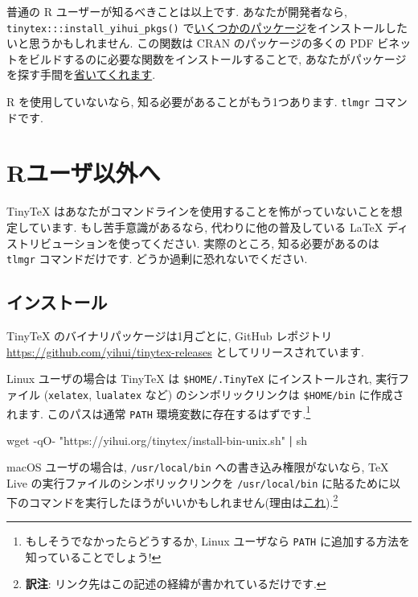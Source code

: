 \documentclass[
  xelatex,ja=standard,jafont=noto]{bxjsreport}
\newenvironment{Shaded}{\begin{snugshade}}{\end{snugshade}}
\newcommand{\AttributeTok}[1]{\textcolor[rgb]{0.77,0.63,0.00}{#1}}
\newcommand{\FunctionTok}[1]{\textcolor[rgb]{0.00,0.00,0.00}{#1}}
\newcommand{\KeywordTok}[1]{\textcolor[rgb]{0.13,0.29,0.53}{\textbf{#1}}}
\newcommand{\StringTok}[1]{\textcolor[rgb]{0.31,0.60,0.02}{#1}}
\begin{document}
普通の R ユーザーが知るべきことは以上です. あなたが開発者なら,
\texttt{tinytex:::install\_yihui\_pkgs()}
で\href{https://github.com/yihui/tinytex/blob/master/tools/pkgs-yihui.txt}{いくつかのパッケージ}をインストールしたいと思うかもしれません.
この関数は CRAN のパッケージの多くの PDF
ビネットをビルドするのに必要な関数をインストールすることで,
あなたがパッケージを探す手間を\href{https://github.com/yihui/tinytex/issues/135}{省いてくれます}.

R を使用していないなら, 知る必要があることがもう1つあります.
\texttt{tlmgr} コマンドです.

\hypertarget{rux30e6ux30fcux30b6ux4ee5ux5916ux3078}{%
\section{Rユーザ以外へ}\label{rux30e6ux30fcux30b6ux4ee5ux5916ux3078}}

TinyTeX
はあなたがコマンドラインを使用することを怖がっていないことを想定しています.
もし苦手意識があるなら, 代わりに他の普及している LaTeX
ディストリビューションを使ってください. 実際のところ, 知る必要があるのは
\texttt{tlmgr} コマンドだけです. どうか過剰に恐れないでください.

\hypertarget{ux30a4ux30f3ux30b9ux30c8ux30fcux30eb}{%
\subsection{インストール}\label{ux30a4ux30f3ux30b9ux30c8ux30fcux30eb}}

TinyTeX のバイナリパッケージは1月ごとに, GitHub レポジトリ
\url{https://github.com/yihui/tinytex-releases}
としてリリースされています.

Linux ユーザの場合は TinyTeX は \texttt{\$HOME/.TinyTeX}
にインストールされ, 実行ファイル (\texttt{xelatex}, \texttt{lualatex}
など) のシンボリックリンクは \texttt{\$HOME/bin} に作成されます.
このパスは通常 \texttt{PATH} 環境変数に存在するはずです.\footnote{もしそうでなかったらどうするか,
  Linux ユーザなら \texttt{PATH} に追加する方法を知っていることでしょう!}

\begin{Shaded}
\begin{Highlighting}[]
\FunctionTok{wget} \AttributeTok{{-}qO{-}} \StringTok{"https://yihui.org/tinytex/install{-}bin{-}unix.sh"} \KeywordTok{|} \FunctionTok{sh}
\end{Highlighting}
\end{Shaded}

macOS ユーザの場合は, \texttt{/usr/local/bin}
への書き込み権限がないなら, TeX Live
の実行ファイルのシンボリックリンクを \texttt{/usr/local/bin}
に貼るために以下のコマンドを実行したほうがいいかもしれません(理由は\href{https://github.com/yihui/tinytex/issues/188}{これ}).\footnote{\textbf{訳注}:
  リンク先はこの記述の経緯が書かれているだけです.}
\end{document}
